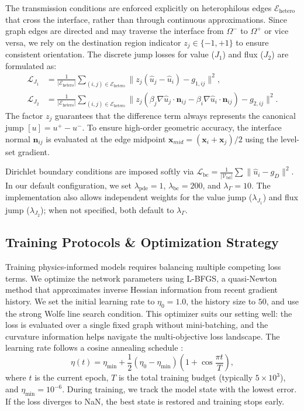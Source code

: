 \documentclass[11pt]{article}
\theoremstyle{definition}
\theoremstyle{remark}
\theoremstyle{plain}
\begin{document}
The transmission conditions are enforced explicitly on heterophilous edges $\mathcal{E}_{\text{hetero}}$ that cross the interface, rather than through continuous approximations. Since graph edges are directed and may traverse the interface from $\Omega^-$ to $\Omega^+$ or vice versa, we rely on the destination region indicator $z_j \in \{-1, +1\}$ to ensure consistent orientation. The discrete jump losses for value ($J_1$) and flux ($J_2$) are formulated as:
\begin{align}
    \mathcal{L}_{J_1} &= \frac{1}{|\mathcal{E}_{\text{hetero}}|} \sum_{(i,j) \in \mathcal{E}_{\text{hetero}}} \| z_j (\hat{u}_j - \hat{u}_i) - g_{1,ij} \|^2, \\
    \mathcal{L}_{J_2} &= \frac{1}{|\mathcal{E}_{\text{hetero}}|} \sum_{(i,j) \in \mathcal{E}_{\text{hetero}}} \| z_j (\beta_j \nabla \hat{u}_j \cdot \mathbf{n}_{ij} - \beta_i \nabla \hat{u}_i \cdot \mathbf{n}_{ij}) - g_{2,ij} \|^2.
\end{align}
The factor $z_j$ guarantees that the difference term always represents the canonical jump $[u] = u^+ - u^-$. To ensure high-order geometric accuracy, the interface normal $\mathbf{n}_{ij}$ is evaluated at the edge midpoint $\mathbf{x}_{mid} = (\mathbf{x}_i + \mathbf{x}_j)/2$ using the level-set gradient.

Dirichlet boundary conditions are imposed softly via $\mathcal{L}_{\text{bc}} = \frac{1}{|\mathcal{V}_{\text{bd}}|} \sum \| \hat{u}_i - g_D \|^2$. In our default configuration, we set $\lambda_{\text{pde}} = 1$, $\lambda_{\text{bc}} = 200$, and $\lambda_{\Gamma} = 10$. The implementation also allows independent weights for the value jump ($\lambda_{J_1}$) and flux jump ($\lambda_{J_2}$); when not specified, both default to $\lambda_{\Gamma}$.

\subsection{Training Protocols \& Optimization Strategy}
\label{sec:training}

Training physics-informed models requires balancing multiple competing loss terms. We optimize the network parameters using L-BFGS, a quasi-Newton method that approximates inverse Hessian information from recent gradient history. We set the initial learning rate to $\eta_0 = 1.0$, the history size to $50$, and use the strong Wolfe line search condition. This optimizer suits our setting well: the loss is evaluated over a single fixed graph without mini-batching, and the curvature information helps navigate the multi-objective loss landscape. The learning rate follows a cosine annealing schedule \cite{loshchilov2016sgdr}:
\begin{equation}
    \eta(t) = \eta_{\min} + \frac{1}{2}(\eta_0 - \eta_{\min}) \left( 1 + \cos\frac{\pi t}{T} \right),
\end{equation}
where $t$ is the current epoch, $T$ is the total training budget (typically $5 \times 10^3$), and $\eta_{\min} = 10^{-6}$. During training, we track the model state with the lowest error. If the loss diverges to NaN, the best state is restored and training stops early.
\end{document}
